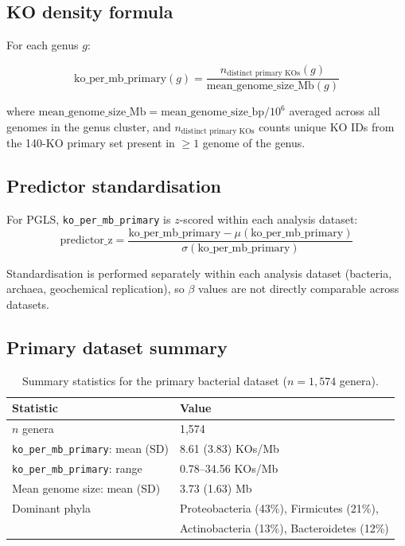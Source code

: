 \documentclass[11pt]{article}
\begin{document}
\subsection{KO density formula}

For each genus $g$:

\begin{equation}
\text{ko\_per\_mb\_primary}(g) =
  \frac{n_{\text{distinct primary KOs}}(g)}{\text{mean\_genome\_size\_Mb}(g)}
\end{equation}

where $\text{mean\_genome\_size\_Mb} = \text{mean\_genome\_size\_bp} / 10^6$
averaged across all genomes in the genus cluster, and
$n_{\text{distinct primary KOs}}$ counts unique KO IDs from the 140-KO primary
set present in $\geq 1$ genome of the genus.

\subsection{Predictor standardisation}

For PGLS, \texttt{ko\_per\_mb\_primary} is $z$-scored within each analysis
dataset:
\begin{equation}
\text{predictor\_z} = \frac{\text{ko\_per\_mb\_primary} -
  \mu(\text{ko\_per\_mb\_primary})}{\sigma(\text{ko\_per\_mb\_primary})}
\end{equation}

Standardisation is performed separately within each analysis dataset
(bacteria, archaea, geochemical replication), so $\beta$ values are not
directly comparable across datasets.

\subsection{Primary dataset summary}

\begin{table}[H]
\centering
\caption{Summary statistics for the primary bacterial dataset ($n = 1{,}574$
genera).}
\label{tab:datasummary}
\small
\begin{tabular}{ll}
\toprule
Statistic & Value \\
\midrule
$n$ genera & 1,574 \\
\texttt{ko\_per\_mb\_primary}: mean (SD) & 8.61 (3.83) KOs/Mb \\
\texttt{ko\_per\_mb\_primary}: range & 0.78--34.56 KOs/Mb \\
Mean genome size: mean (SD) & 3.73 (1.63) Mb \\
Dominant phyla & Proteobacteria (43\%), Firmicutes (21\%), \\
 & Actinobacteria (13\%), Bacteroidetes (12\%) \\
\bottomrule
\end{tabular}
\end{table}
\end{document}
